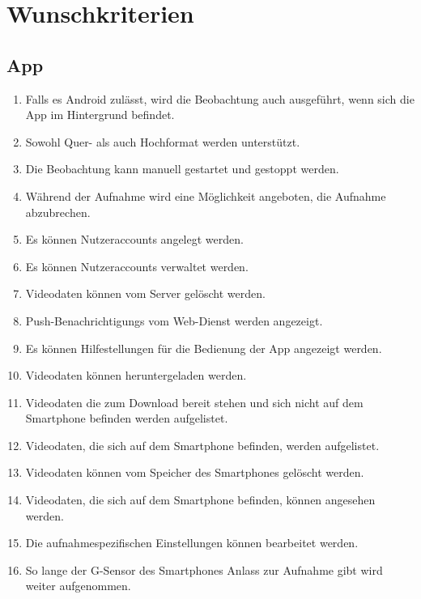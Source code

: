 \section{Wunschkriterien}
\subsection{App}
	\begin{enumerate}
	\renewcommand{\labelenumi}{\textbf{\theenumi}}
	\renewcommand{\theenumi}{WK\arabic{enumi}0}
	\setcounter{enumi}{99}
	\item Falls es \gls{Android} zulässt, wird die Beobachtung auch ausgeführt, wenn sich die \gls{App} im Hintergrund befindet.
	\item Sowohl Quer- als auch Hochformat werden unterstützt.
	\item Die Beobachtung kann manuell gestartet und gestoppt werden.
	\item Während der Aufnahme wird eine Möglichkeit angeboten, die Aufnahme abzubrechen.
	\item Es können Nutzeraccounts angelegt werden.
	\item Es können Nutzeraccounts verwaltet werden.
	\item {} Videodaten können vom Server gelöscht werden.
	\item \glspl{Push-Benachrichtigung} vom \gls{Web-Dienst} werden angezeigt.
	\item Es können Hilfestellungen für die Bedienung der \gls{App} angezeigt werden.
	\item {} Videodaten können heruntergeladen werden.
	\item {} Videodaten die zum Download bereit stehen und sich nicht auf dem \gls{Smartphone} befinden werden aufgelistet.
	\item {} Videodaten, die sich auf dem \gls{Smartphone} befinden, werden aufgelistet.
	\item {} Videodaten können vom Speicher des \glspl{Smartphone} gelöscht werden.
	\item {} Videodaten, die sich auf dem \gls{Smartphone} befinden, können angesehen werden.
	\item Die aufnahmespezifischen Einstellungen können bearbeitet werden.
	\item So lange der \gls{G-Sensor} des Smartphones Anlass zur Aufnahme gibt wird weiter aufgenommen.
	\end{enumerate}
